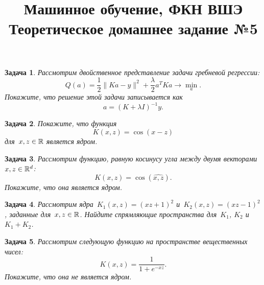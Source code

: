 \documentclass[12pt,fleqn]{article}
\title{Машинное обучение, ФКН ВШЭ\\Теоретическое домашнее задание №5}
\author{}
\date{}
\newtheorem{esProblem}{Задача}
\begin{document}
\maketitle

\begin{esProblem}
    Рассмотрим двойственное представление задачи гребневой регрессии:
    \[
        Q(a)
        =
        \frac{1}{2} \| K a - y \|^2 + \frac{\lambda}{2} a^T K a \to \min_a.
    \]
    Покажите, что решение этой задачи записывается как
    \[
        a = (K + \lambda I)^{-1} y.
    \]
\end{esProblem}

\begin{esProblem}
    Покажите, что функция
    \[
        K(x, z) = \cos(x - z)
    \]
    для~$x, z \in \mathbb{R}$ является ядром.
\end{esProblem}

\begin{esProblem}
    Рассмотрим функцию, равную косинусу угла между двумя векторами~$x, z \in \mathbb{R}^d$:
    \[
        K(x, z) = \cos(\widehat{x, z}).
    \]
    Покажите, что она является ядром.
\end{esProblem}

\begin{esProblem}
    Рассмотрим ядра~$K_1(x, z) = (xz + 1)^2$ и~$K_2(x, z) = (xz - 1)^2$,
    заданные для~$x, z \in \mathbb{R}$.
    Найдите спрямляющие пространства для~$K_1$, $K_2$ и~$K_1 + K_2$.
\end{esProblem}

\begin{esProblem}
    Рассмотрим следующую функцию на пространстве вещественных чисел:
    \[
        K(x, z) = \frac{1}{1 + e^{-xz}}.
    \]
    Покажите, что она не является ядром.
\end{esProblem}
\end{document}
